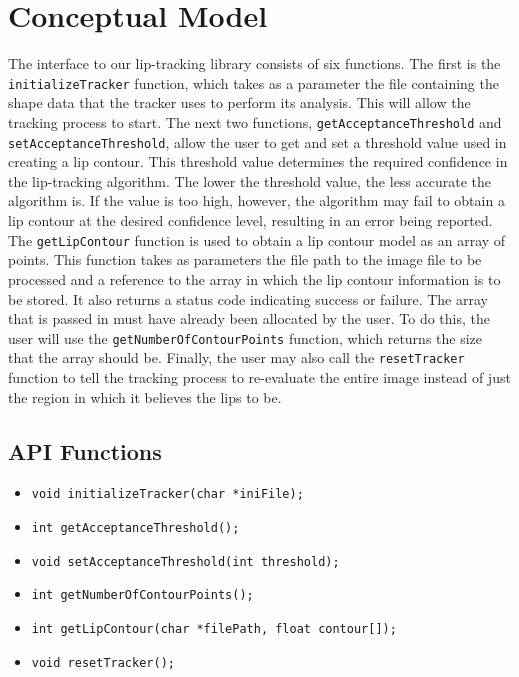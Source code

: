 \chapter{Conceptual Model}

The interface to our lip-tracking library consists of six functions. The first is the \texttt{initializeTracker} function, which takes as a parameter the file containing the shape data that the tracker uses to perform its analysis. This will allow the tracking process to start. The next two functions, \texttt{getAcceptanceThreshold} and \texttt{setAcceptanceThreshold}, allow the user to get and set a threshold value used in creating a lip contour. This threshold value determines the required confidence in the lip-tracking algorithm. The lower the threshold value, the less accurate the algorithm is. If the value is too high, however, the algorithm may fail to obtain a lip contour at the desired confidence level, resulting in an error being reported. The \texttt{getLipContour} function is used to obtain a lip contour model as an array of points. This function takes as parameters the file path to the image file to be processed and a reference to the array in which the lip contour information is to be stored. It also returns a status code indicating success or failure. The array that is passed in must have already been allocated by the user. To do this, the user will use the \texttt{getNumberOfContourPoints} function, which returns the size that the array should be. Finally, the user may also call the \texttt{resetTracker} function to tell the tracking process to re-evaluate the entire image instead of just the region in which it believes the lips to be.

\section{API Functions}
\begin{itemize}
\setlength\itemsep{-0.5em}
\item \texttt{void initializeTracker(char *iniFile);}
\item \texttt{int getAcceptanceThreshold();}
\item \texttt{void setAcceptanceThreshold(int threshold);}
\item \texttt{int getNumberOfContourPoints();}
\item \texttt{int getLipContour(char *filePath, float contour[]);}
\item \texttt{void resetTracker();}
\end{itemize}